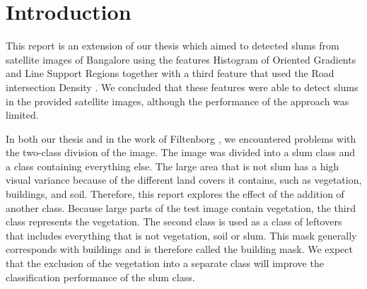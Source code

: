 \section{Introduction}
This report is an extension of our thesis which aimed to detected slums from satellite images of Bangalore using the features Histogram of Oriented Gradients and Line Support Regions together with a third feature that used the Road intersection Density \cite{derk}. We concluded that these features were able to detect slums in the provided satellite images, although the performance of the approach was limited. 

In both our thesis and in the work of Filtenborg \cite{max}, we encountered problems with the two-class division of the image. The image was divided into a slum class and a class containing everything else. The large area that is not slum has a high visual variance because of the different land covers it contains, such as vegetation, buildings, and soil. Therefore, this report explores the effect of the addition of another class. Because large parts of the test image contain vegetation, the third class represents the vegetation. The second class is used as a class of leftovers that includes everything that is not vegetation, soil or slum. This mask generally corresponds with buildings and is therefore called the building mask. We expect that the exclusion of the vegetation into a separate class will improve the classification performance of the slum class.